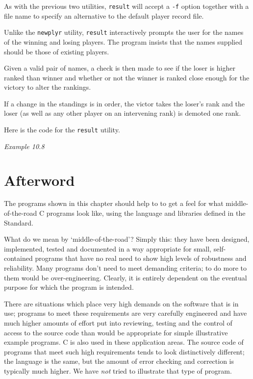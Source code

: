   As with the previous two utilities, \texttt{result} will accept
   a \texttt{-f} option together with a file name to specify an alternative
   to the default player record file.


  Unlike the \texttt{newplyr} utility, \texttt{result} interactively
   prompts the user for the names of the winning and losing players. The
   program insists that the names supplied should be those of existing
   players.


  Given a valid pair of names, a check is then made to see if the loser is
   higher ranked than winner and whether or not the winner is ranked close
   enough for the victory to alter the rankings.


  If a change in the standings is in order, the victor takes the loser's
   rank and the loser (as well as any other player on an intervening rank) is
   demoted one rank.


  Here is the code for the \texttt{result} utility.


  \begin{center}\textit{Example 10.8}\end{center}

 
 
        \section{Afterword}
        

  

  The programs shown in this chapter should help to to get a feel for
   what middle-of-the-road C programs look like, using the language and
   libraries defined in the Standard.


  What do we mean by `middle-of-the-road'? Simply this: they have
   been designed, implemented, tested and documented in a way appropriate
   for small, self-contained programs that have no real need to show high
   levels of robustness and reliability. Many programs don't need to meet
   demanding criteria; to do more to them would be over-engineering.
   Clearly, it is entirely dependent on the eventual purpose for which the
   program is intended.


  There are situations which place very high demands on the software that
   is in use; programs to meet these requirements are very carefully
   engineered and have much higher amounts of effort put into reviewing,
   testing and the control of access to the source code than would be
   appropriate for simple illustrative example programs. C is also used in
   these application areas.  The source code of programs that meet such high
   requirements tends to look distinctively different; the language is the
   same, but the amount of error checking and correction is typically much
   higher. We have \textit{not} tried to illustrate that type of
   program.


